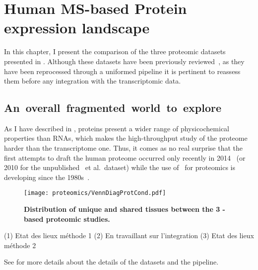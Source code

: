 \chapter{Human MS-based Protein expression landscape}\label{ch:proteomics}


In this chapter, I present the comparison of
the three proteomic datasets presented in .
Although these datasets have been previously
reviewed~,
as they have been reprocessed through a uniformed pipeline
it is pertinent to reassess them before any integration with the transcriptomic data.

\section{An~overall~fragmented~world~to~explore}

As I have described in ,
proteins present a wider range of physicochemical properties than \glspl{RNA},
which makes the high-throughput study of the proteome
harder than the transcriptome one.
Thus, it comes as no real surprise that
the first attempts to draft the human proteome occurred only recently
in 2014~
(or 2010 for the unpublished \cutler\ et al.\ dataset)
while the use of \ms\ for proteomics is developing since the 1980s~.



\begin{figure}[htpb]
    \texttt{[image: proteomics/VennDiagProtCond.pdf]}\centering
    \caption[Distribution of unique shared tissues between
    the 3 MS-based proteomic studies]{\label{fig:VennDiagProt3}\textbf{Distribution
    of unique and shared tissues between the 3 \ms{}-based proteomic studies.}}
\end{figure}








(1) Etat des lieux méthode 1
(2) En travaillant sur l'integration 
(3) Etat des lieux méthode 2

See  for more details about the details of the datasets and
the pipeline.

